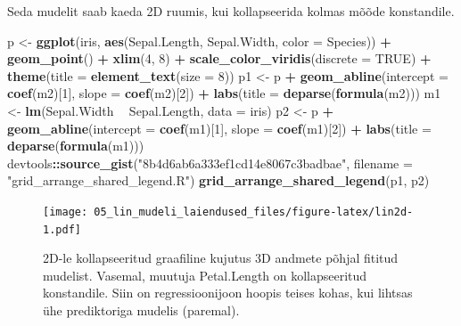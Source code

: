 \documentclass[]{book}
\newenvironment{Shaded}{\begin{snugshade}}{\end{snugshade}}
\newcommand{\KeywordTok}[1]{\textcolor[rgb]{0.13,0.29,0.53}{\textbf{#1}}}
\newcommand{\DataTypeTok}[1]{\textcolor[rgb]{0.13,0.29,0.53}{#1}}
\newcommand{\DecValTok}[1]{\textcolor[rgb]{0.00,0.00,0.81}{#1}}
\newcommand{\StringTok}[1]{\textcolor[rgb]{0.31,0.60,0.02}{#1}}
\newcommand{\OtherTok}[1]{\textcolor[rgb]{0.56,0.35,0.01}{#1}}
\newcommand{\OperatorTok}[1]{\textcolor[rgb]{0.81,0.36,0.00}{\textbf{#1}}}
\newcommand{\NormalTok}[1]{#1}
\begin{document}
Seda mudelit saab kaeda 2D ruumis, kui kollapseerida kolmas mõõde
konstandile.






\begin{Shaded}
\begin{Highlighting}[]
\NormalTok{p <-}\StringTok{ }\KeywordTok{ggplot}\NormalTok{(iris, }\KeywordTok{aes}\NormalTok{(Sepal.Length, Sepal.Width, }\DataTypeTok{color =}\NormalTok{ Species)) }\OperatorTok{+}
\StringTok{  }\KeywordTok{geom_point}\NormalTok{() }\OperatorTok{+}
\StringTok{  }\KeywordTok{xlim}\NormalTok{(}\DecValTok{4}\NormalTok{, }\DecValTok{8}\NormalTok{) }\OperatorTok{+}
\StringTok{  }\KeywordTok{scale_color_viridis}\NormalTok{(}\DataTypeTok{discrete =} \OtherTok{TRUE}\NormalTok{) }\OperatorTok{+}
\StringTok{  }\KeywordTok{theme}\NormalTok{(}\DataTypeTok{title =} \KeywordTok{element_text}\NormalTok{(}\DataTypeTok{size =} \DecValTok{8}\NormalTok{))}
\NormalTok{p1 <-}\StringTok{ }\NormalTok{p }\OperatorTok{+}\StringTok{ }\KeywordTok{geom_abline}\NormalTok{(}\DataTypeTok{intercept =} \KeywordTok{coef}\NormalTok{(m2)[}\DecValTok{1}\NormalTok{], }\DataTypeTok{slope =} \KeywordTok{coef}\NormalTok{(m2)[}\DecValTok{2}\NormalTok{]) }\OperatorTok{+}
\StringTok{  }\KeywordTok{labs}\NormalTok{(}\DataTypeTok{title =} \KeywordTok{deparse}\NormalTok{(}\KeywordTok{formula}\NormalTok{(m2)))}
\NormalTok{m1 <-}\StringTok{ }\KeywordTok{lm}\NormalTok{(Sepal.Width }\OperatorTok{~}\StringTok{ }\NormalTok{Sepal.Length, }\DataTypeTok{data =}\NormalTok{ iris)}
\NormalTok{p2 <-}\StringTok{ }\NormalTok{p }\OperatorTok{+}\StringTok{ }\KeywordTok{geom_abline}\NormalTok{(}\DataTypeTok{intercept =} \KeywordTok{coef}\NormalTok{(m1)[}\DecValTok{1}\NormalTok{], }\DataTypeTok{slope =} \KeywordTok{coef}\NormalTok{(m1)[}\DecValTok{2}\NormalTok{]) }\OperatorTok{+}
\StringTok{  }\KeywordTok{labs}\NormalTok{(}\DataTypeTok{title =} \KeywordTok{deparse}\NormalTok{(}\KeywordTok{formula}\NormalTok{(m1)))}
\NormalTok{devtools}\OperatorTok{::}\KeywordTok{source_gist}\NormalTok{(}\StringTok{"8b4d6ab6a333ef1cd14e8067c3badbae"}\NormalTok{, }\DataTypeTok{filename =} \StringTok{"grid_arrange_shared_legend.R"}\NormalTok{)}
\KeywordTok{grid_arrange_shared_legend}\NormalTok{(p1, p2)}
\end{Highlighting}
\end{Shaded}

\begin{figure}
\centering
\texttt{[image: 05\_lin\_mudeli\_laiendused\_files/figure-latex/lin2d-1.pdf]}
\caption{\label{fig:lin2d}2D-le kollapseeritud graafiline kujutus 3D andmete põhjal
fititud mudelist. Vasemal, muutuja Petal.Length on kollapseeritud
konstandile. Siin on regressioonijoon hoopis teises kohas, kui lihtsas
ühe prediktoriga mudelis (paremal).}
\end{figure}
\end{document}
